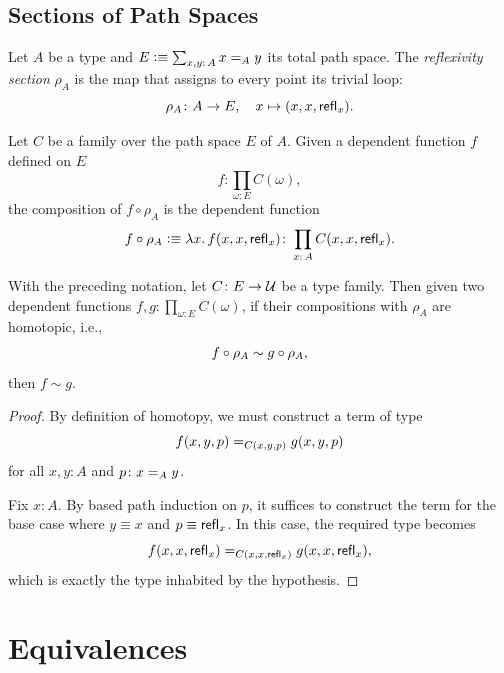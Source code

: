 \subsection{Sections of Path Spaces}

\begin{defn}
    Let $A$ be a type and $E\defeq\sum_{x,y\colon A}x\eq Ay$ its total path space. The \textsl{reflexivity section} $\rho_A$ is the map that assigns to every point its trivial loop:
    \[
        \rho_A\colon A\to E,
        \quad x\mapsto(x,x,\fun{refl}_x).
    \]
\end{defn}

\begin{rem}
    Let $C$ be a family over the path space $E$ of $A$. Given a dependent function $f$ defined on $E$
    \[
        f\colon\prod_{\omega\colon E}C(\omega),
    \]
    the composition of $f\circ\rho_A$ is the dependent function
    \[
        f\circ\rho_A\defeq\lambda x.\, f(x,x,\fun{refl}_x)
        \colon\prod_{x\colon A}C(x,x,\fun{refl}_x).
    \]
    
\end{rem}

\begin{lem}\label{lem:pre-composition-with-rho}
    With the preceding notation, let\/ $C\colon E\to\univ$ be a type family. Then given two dependent functions\/ $f,g\colon\prod_{\omega\colon E}C(\omega)$, if their compositions with\/ $\rho_A$ are homotopic, i.e.,
    \[
        f\circ\mathsf{\rho}_A\sim g\circ\mathsf{\rho}_A,
    \]
    then\/ $f\sim g$.
\end{lem}

\begin{proof}
    By definition of homotopy, we must construct a term of type
    \[
        f(x,y,p) \mathrel{=_{C(x,y,p)}} g(x,y,p)
    \]
    for all $x,y \colon A$ and $p\colon x\eq Ay$.
    
    Fix $x \colon A$. By based path induction on $p$, it suffices to construct the term for the base case where $y\equiv x$ and $p\equiv\mathsf{refl}_x$. In this case, the required type becomes
    \[
        f(x, x, \mathsf{refl}_x) \mathrel{=_{C(x,x,\mathsf{refl}_x)}} g(x, x, \mathsf{refl}_x),
    \]
    which is exactly the type inhabited by the hypothesis.
\end{proof}


\section{Equivalences}

